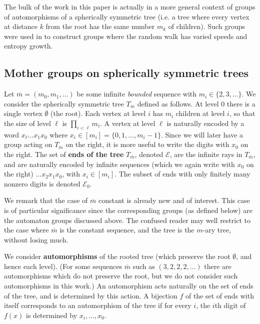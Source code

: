 \documentclass[12pt]{article}
\theoremstyle{definition}
\numberwithin{equation}{section}
\newcommand{\cE}{\mathcal{E}}
\newcommand{\mbar}{{\overline m}}
\begin{document}
\medskip

The bulk of the work in this paper is actually in a more general context of groups of automorphisms of a spherically symmetric tree (i.e. a tree where every vertex at distance $k$ from the root has the same number $m_k$ of children).
Such groups were used in \cite{Bri13,AV,Amir} to construct groups where the random walk has varied speeds and entropy growth.




\subsection{Mother groups on spherically symmetric trees}

Let $\mbar = (m_0,m_1,\dots)$ be some infinite \emph{bounded} sequence with $m_i\in\{2,3,\dots\}$.
We consider the spherically symmetric tree
$T_\mbar$ defined as follows.  At level $0$ there is a single vertex
$\emptyset$ (the root).  Each vertex at level $i$ has $m_i$ children at
level $i$, so that the size of level $\ell$ is $\prod_{i<\ell} m_i$.  A
vertex at level $\ell$ is naturally encoded by a word $x_\ell\dots x_1 x_0$
where $x_i\in[m_i] = \{0,1,\dots,m_i-1\}$.  Since we will later have a
group acting on $T_\mbar$ on the right, it is more useful to write the digits with $x_0$ on the right.
The set of \textbf{ends of the tree} $T_\mbar$, denoted $\cE$, are the infinite rays in $T_\mbar$, and are naturally encoded by infinite sequences (which we again write with $x_0$ on the right) $\dots x_2 x_1 x_0$, with $x_i\in[m_i]$.
The subset of ends with only finitely many nonzero digits is denoted $\cE_0$.

We remark that the case of $\mbar$ constant is already new and of interest.
This case is of particular significance since the corresponding groups (as defined below) are the automaton groups discussed above.
The confused reader may well restrict to the case where $\mbar$ is the constant sequence, and the tree is the $m$-ary tree, without losing much.

We consider \textbf{automorphisms} of the rooted tree (which preserve the root $\emptyset$, and hence each level).
(For some sequences $\mbar$ such as $(3,2,2,2,\dots)$ there are automorphisms which do not preserve the root, but we do not consider such automorphisms in this work.)
An automorphism acts naturally on the set of ends of the tree, and is
determined by this action.
A bijection $f$ of the set of ends with itself corresponds to an automorphism of the tree if for every $i$, the $i$th
digit of $f(x)$ is determined by $x_i,\dots,x_0$.
\end{document}
